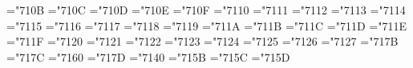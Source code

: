 
\def\setbaselines{\maxdepth=4\rp@\baselinestretch=\@basestretchnum}


\def\baselinestretch{\afterassignment\@basestretch\@basestretchnum}
\def\@basestretch{%
	\@baseskip=12\rp@ \divide\@baseskip by1000
	\normalbaselineskip=\@basestretchnum\@baseskip
	\baselineskip=\normalbaselineskip
	\bigskipamount=\the\baselineskip
		plus.25\baselineskip minus.25\baselineskip
	\medskipamount=.5\baselineskip
		plus.125\baselineskip minus.125\baselineskip
	\smallskipamount=.25\baselineskip
		plus.0625\baselineskip minus.0625\baselineskip
	\setbox\strutbox=\hbox{\vrule height.708\baselineskip
		depth.292\baselineskip width0pt }}




\def\makeheadline{\vbox to0pt{\baselinestretch=1000
	\vskip-\headskip \vskip1.5pt
	\line{\vbox to\ht\strutbox{}\the\headline}\vss}\nointerlineskip}

\def\makefootline{\baselineskip=\footskip\line{\the\footline}}

\def\big#1{{\hbox{$\left#1\vbox to8.5\rp@ {}\right.\n@space$}}}
\def\Big#1{{\hbox{$\left#1\vbox to11.5\rp@ {}\right.\n@space$}}}
\def\bigg#1{{\hbox{$\left#1\vbox to14.5\rp@ {}\right.\n@space$}}}
\def\Bigg#1{{\hbox{$\left#1\vbox to17.5\rp@ {}\right.\n@space$}}}


\mathchardef\alpha="710B
\mathchardef\beta="710C
\mathchardef\gamma="710D
\mathchardef\delta="710E
\mathchardef\epsilon="710F
\mathchardef\zeta="7110
\mathchardef\eta="7111
\mathchardef\theta="7112
\mathchardef\iota="7113
\mathchardef\kappa="7114
\mathchardef\lambda="7115
\mathchardef\mu="7116
\mathchardef\nu="7117
\mathchardef\xi="7118
\mathchardef\pi="7119
\mathchardef\rho="711A
\mathchardef\sigma="711B
\mathchardef\tau="711C
\mathchardef\upsilon="711D
\mathchardef\phi="711E
\mathchardef\chi="711F
\mathchardef\psi="7120
\mathchardef\omega="7121
\mathchardef\varepsilon="7122
\mathchardef\vartheta="7123
\mathchardef\varpi="7124
\mathchardef\varrho="7125
\mathchardef\varsigma="7126
\mathchardef\varphi="7127
\mathchardef\imath="717B
\mathchardef\jmath="717C
\mathchardef\ell="7160
\mathchardef\wp="717D
\mathchardef\partial="7140
\mathchardef\flat="715B
\mathchardef\natural="715C
\mathchardef\sharp="715D


